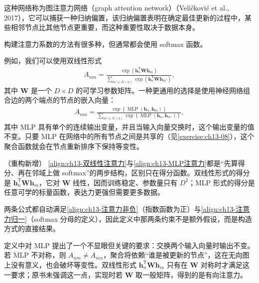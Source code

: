 \documentclass[../../main.tex]{subfiles}
\begin{document}
这种网络称为图注意力网络（graph attention network）（Veličković et al., 2017），它可以捕获一种归纳偏置，该归纳偏置表明在确定最佳更新的过程中，某些相邻节点比其他节点更重要，而这种重要性取决于数据本身。

构建注意力系数的方法有很多种，但通常都会使用 softmax 函数。

\begin{definition}[注意力系数]\label{definition:ch13-注意力系数}
例如，我们可以使用双线性形式
\begin{align}
A_{nm}=\frac{\exp\!\left(\bm{h}_n^{\mathsf T}\bm{W}\bm{h}_m\right)}{\sum_{m'\in\mathcal{N}(n)}\exp\!\left(\bm{h}_n^{\mathsf T}\bm{W}\bm{h}_{m'}\right)},
\label{align:ch13-双线性注意力}
\end{align}
其中 $\bm{W}$ 是一个 $D\times D$ 的可学习参数矩阵。一种更通用的选择是使用神经网络组合边的两个端点的节点的嵌入向量：
\begin{align}
A_{nm}=\frac{\exp\!\left\{\operatorname{MLP}(\bm{h}_n,\bm{h}_m)\right\}}{\sum_{m'\in\mathcal{N}(n)}\exp\!\left\{\operatorname{MLP}(\bm{h}_n,\bm{h}_{m'})\right\}},
\label{align:ch13-MLP注意力}
\end{align}
其中 MLP 具有单个的连续输出变量，并且当输入向量交换时，这个输出变量的值不变。只要 MLP 在网络中的所有节点之间是共享的（见\cref{exercise:ch13-08}），这个聚合函数就会在节点重新排序下保持等变性。
\end{definition}

\begin{remark}（重构新增）
\eqref{align:ch13-双线性注意力}与\eqref{align:ch13-MLP注意力}都是“先算得分、再在邻域上做 softmax”的两步结构，区别只在得分函数。双线性形式的得分是 $\bm{h}_n^{\mathsf T}\bm{W}\bm{h}_m$，它对 $\bm{W}$ 线性，因而训练稳定、参数量只有 $D^2$；MLP 形式的得分是任意可学的标量函数，表达力更强但需要更多数据。\par
两条公式都自动满足\eqref{align:ch13-注意力非负}（指数函数为正）与\eqref{align:ch13-注意力归一}（softmax 分母的定义），因此定义中那两条约束不是额外假设，而是构造方式的直接结果。\par
定义中对 MLP 提出了一个不显眼但关键的要求：交换两个输入向量时输出不变。若 MLP 不对称，则 $A_{nm}\neq A_{mn}$，聚合将依赖“谁是被更新的节点”，这在无向图上没有意义，也会破坏等变性。双线性形式 $\bm{h}_n^{\mathsf T}\bm{W}\bm{h}_m$ 只有在 $\bm{W}$ 对称时才满足这一要求；原书未强调这一点，实现时若 $\bm{W}$ 取一般矩阵，得到的是有向注意力。
\end{remark}
\end{document}
